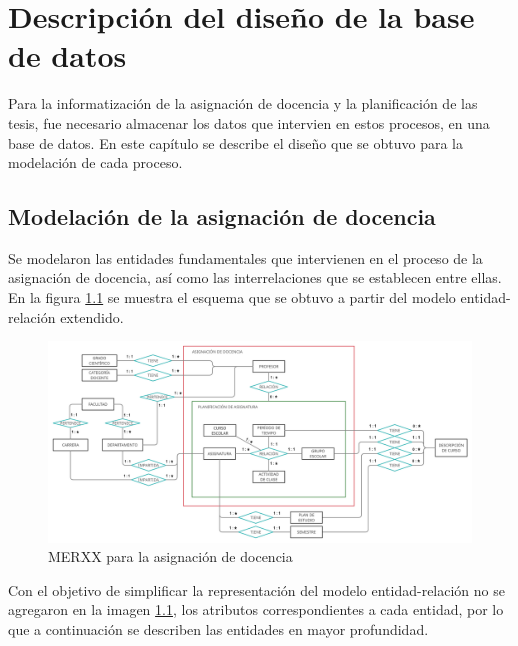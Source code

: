\chapter{Descripción del diseño de la base de datos}\label{chapter:database}
Para la informatización de la asignación de docencia y la planificación de 
las tesis, fue necesario almacenar los datos que intervien en estos procesos, en una base de datos.
En este capítulo se describe el diseño que se obtuvo para la modelación de 
cada proceso.


\section{Modelación de la asignación de docencia}\label{database:asignación-docencia}

Se modelaron las entidades fundamentales
que intervienen en el proceso de la asignación de docencia, 
así como las interrelaciones que se establecen entre ellas.
En la figura \ref{merxx-docencia} se muestra el esquema que se obtuvo a partir 
del modelo entidad-relación extendido.

\begin{figure}[H]
    \includegraphics[scale=0.31]{Graphics/Database/MERXX-TA-FINAL.png}
    \caption{MERXX para la asignación de docencia}
    \label{merxx-docencia}
    
\end{figure}


Con el objetivo de simplificar la representación del modelo entidad-relación
no se agregaron en la imagen \ref{merxx-docencia}, los atributos correspondientes a cada entidad, por lo 
que a continuación se describen las entidades en mayor profundidad.


